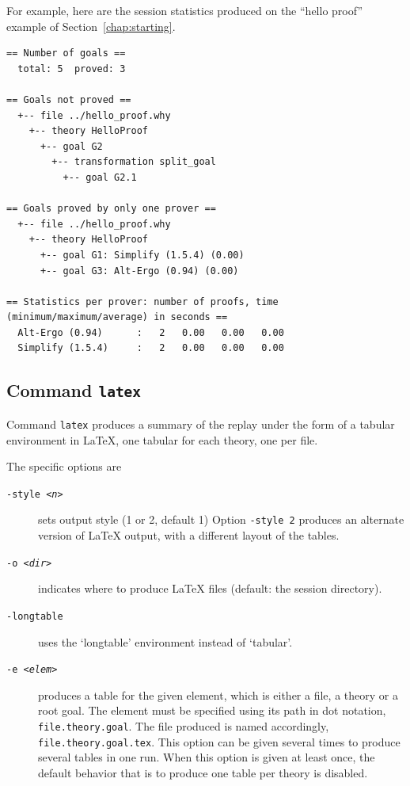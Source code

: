For example, here are the session statistics produced on the ``hello
proof'' example of Section~\ref{chap:starting}.
{\footnotesize
\begin{verbatim}
== Number of goals ==
  total: 5  proved: 3

== Goals not proved ==
  +-- file ../hello_proof.why
    +-- theory HelloProof
      +-- goal G2
        +-- transformation split_goal
          +-- goal G2.1

== Goals proved by only one prover ==
  +-- file ../hello_proof.why
    +-- theory HelloProof
      +-- goal G1: Simplify (1.5.4) (0.00)
      +-- goal G3: Alt-Ergo (0.94) (0.00)

== Statistics per prover: number of proofs, time (minimum/maximum/average) in seconds ==
  Alt-Ergo (0.94)      :   2   0.00   0.00   0.00
  Simplify (1.5.4)     :   2   0.00   0.00   0.00

\end{verbatim}
}

\subsection{Command \texttt{latex}}

Command \texttt{latex} produces a summary of the replay under the form
of a tabular environment in LaTeX, one tabular for each theory, one
per file.

The specific options are
\begin{description}
\item[\texttt{-style \textsl{<n>}}] sets output style (1 or 2, default 1)
  Option \texttt{-style 2} produces an alternate version of LaTeX
  output, with a different layout of the tables.
\item[\texttt{-o \textsl{<dir>}}] indicates where
  to produce LaTeX files (default: the session directory).
\item[\texttt{-longtable}] uses the `longtable' environment instead of
  `tabular'.
\item[\texttt{-e \textsl{<elem>}}] produces a table for the given element, which is
  either a file, a theory or a root goal. The element must be specified
  using its path in dot notation, \eg \verb|file.theory.goal|. The
  file produced is named accordingly,
  \eg \verb|file.theory.goal.tex|.  This option can be given several
  times to produce several tables in one run. When this option is
  given at least once, the default behavior that is to produce one
  table per theory is disabled.
\end{description}

